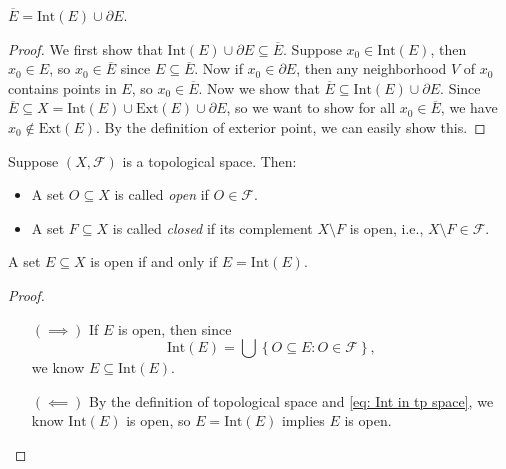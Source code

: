 \begin{corollary}
    \(\overline{E} = \mathrm{Int}(E) \cup \partial E  \). 
\end{corollary}
\begin{proof}
    We first show that \(\mathrm{Int}(E) \cup \partial E \subseteq \overline{E}  \). Suppose \(x_0 \in \mathrm{Int}(E) \), then \(x_0 \in E\), so \(x_0 \in \overline{E} \) since \(E \subseteq \overline{E} \). Now if \(x_0 \in \partial E\), then any neighborhood \(V\) of \(x_0\) contains points in \(E\), so \(x_0 \in \overline{E} \).  
    Now we show that \(\overline{E} \subseteq \mathrm{Int}(E) \cup \partial E \). Since \(\overline{E} \subseteq X = \mathrm{Int}(E) \cup \mathrm{Ext}(E) \cup \partial E  \), so we want to show for all \(x_0 \in \overline{E} \), we have \(x_0 \notin \mathrm{Ext}(E) \). By the definition of exterior point, we can easily show this.    
\end{proof}

\begin{definition*}\label{def:open-closed topological space ver}
    Suppose \((X, \mathcal{F})\) is a topological space. Then:
    \begin{itemize}
        \item A set \(O \subseteq X\) is called \emph{open} if \(O \in \mathcal{F}\).
        \item A set \(F \subseteq X\) is called \emph{closed} if its complement \(X \setminus F\) is open, i.e., \(X \setminus F \in \mathcal{F}\).
    \end{itemize}
\end{definition*}

\begin{corollary}
    A set \(E \subseteq X\) is open if and only if \(E = \mathrm{Int}(E) \). 
\end{corollary}
\begin{proof}
    \vphantom{text}
    \begin{itemize}
        \item [\((\implies )\)] If \(E\) is open, then since 
        \begin{equation} \label{eq: Int in tp space}
            \mathrm{Int}(E) = \bigcup\left\{ O \subseteq E : O \in \mathcal{F} \right\}, 
        \end{equation}
        we know \(E \subseteq \mathrm{Int}(E) \).  
        \item [\((\impliedby )\)] By the definition of topological space and \autoref{eq: Int in tp space}, we know \(\mathrm{Int}(E) \) is open, so \(E = \mathrm{Int}(E) \) implies \(E\) is open.    
    \end{itemize}
\end{proof}

